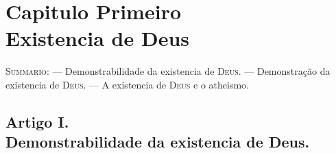 \ifdefined\pg\else{}\fi

\chapter*{Capitulo Primeiro\\[0.3em]\large Existencia de Deus}


{\small\noindent\textsc{Summario}: --- Demonstrabilidade da existencia de \textsc{Deus}. ---
Demonstração da existencia de \textsc{Deus}. --- A existencia de \textsc{Deus} e o atheismo.\par}

\section*{Artigo I.\\ Demonstrabilidade da existencia de Deus.}

